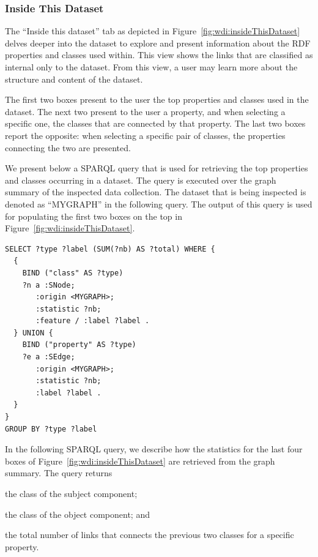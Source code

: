 \subsubsection{Inside This Dataset}

The ``Inside this dataset'' tab as depicted in Figure~\ref{fig:wdi:insideThisDataset} delves deeper into the dataset to explore and present information about the RDF properties and classes used within. This view shows the links that are classified as internal only to the dataset. From this view, a user may learn more about the structure and content of the dataset.

The first two boxes present to the user the top properties and classes used in the dataset.
The next two present to the user a property, and when selecting a specific one, the classes that are connected by that property.
The last two boxes report the opposite: when selecting a specific pair of classes, the properties connecting the two are presented.

We present below a SPARQL query that is used for retrieving the top properties and classes occurring in a dataset. The query is executed over the graph summary of the inspected data collection. The dataset that is being inspected is denoted as ``MYGRAPH'' in the following query. The output of this query is used for populating the first two boxes on the top in Figure~\ref{fig:wdi:insideThisDataset}.

\begin{verbatim}
SELECT ?type ?label (SUM(?nb) AS ?total) WHERE {
  {
    BIND ("class" AS ?type)
    ?n a :SNode;
       :origin <MYGRAPH>;
       :statistic ?nb;
       :feature / :label ?label .
  } UNION {
    BIND ("property" AS ?type)
    ?e a :SEdge;
       :origin <MYGRAPH>;
       :statistic ?nb;
       :label ?label .
  }
}
GROUP BY ?type ?label
\end{verbatim}

In the following SPARQL query, we describe how the statistics for the last four boxes of Figure~\ref{fig:wdi:insideThisDataset} are retrieved from the graph summary. The query returns
\begin{inparaenum}[(a)]
\item the class of the subject component;
\item the class of the object component; and
\item the total number of links that connects the previous two classes for a specific property.
\end{inparaenum}

